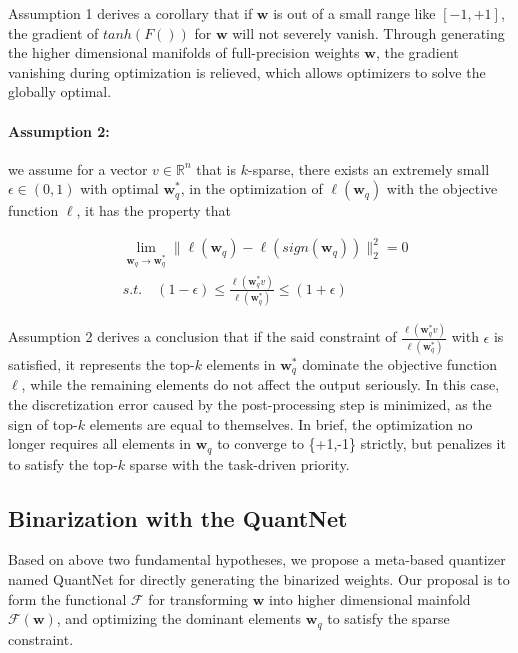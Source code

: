 \documentclass[runningheads]{llncs}
\begin{document}
Assumption 1 derives a corollary that
if $\textbf{w}$ is out of a small range like $[-1,+1]$,
the gradient of $tanh(F())$ for $\textbf{w}$ will not severely vanish.
Through generating the higher dimensional manifolds of full-precision weights $\textbf{w}$,
the gradient vanishing during optimization is relieved,
which allows optimizers to solve the globally optimal.

\paragraph{\textbf{Assumption 2}:} we assume for a vector $v \in \mathbb{R}^n$ that is $k$-sparse,
there exists an extremely small $\epsilon \in (0,1)$ with optimal $\textbf{w}^*_q$,
in the optimization of $\ell(\textbf{w}_q)$ with the objective function $\ell$,
it has the property that

\begin{equation}\label{eq:hypo2}
\begin{split}
&\lim \limits_{\textbf{w}_q \rightarrow \textbf{w}^*_q} \| \ell(\textbf{w}_q) - \ell(sign(\textbf{w}_q)) \|^2_2 = 0 \\
& s.t. \quad (1 - \epsilon) \leq  \frac{\ell(\textbf{w}^*_q v)}{\ell(\textbf{w}^*_q)} \leq  (1 + \epsilon)
\end{split}
\end{equation}

Assumption 2 derives a conclusion that
if the said constraint of $\frac{\ell(\textbf{w}^*_q v)}{\ell(\textbf{w}^*_q)}$ with $\epsilon$ is satisfied,
it represents the top-$k$ elements in $\textbf{w}^*_q$ dominate the objective function $\ell$,
while the remaining elements do not affect the output seriously.
In this case, the discretization error caused by the post-processing step is minimized,
as the sign of top-$k$ elements are equal to themselves.
In brief, the optimization no longer requires all elements in $\textbf{w}_q$ to converge to \{+1,-1\} strictly,
but penalizes it to satisfy the top-$k$ sparse with the task-driven priority.

\subsection{Binarization with the QuantNet}
Based on above two fundamental hypotheses,
we propose a meta-based quantizer named QuantNet for directly generating the binarized weights.
Our proposal is to form the functional $\mathcal{F}$ for transforming $\textbf{w}$
into higher dimensional mainfold $\mathcal{F}(\textbf{w})$,
and optimizing the dominant elements $\textbf{w}_q$ to satisfy the sparse constraint.
\end{document}
